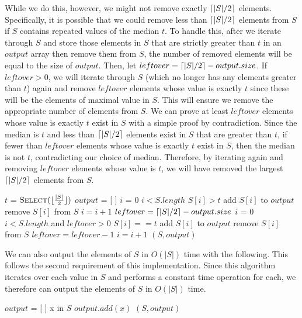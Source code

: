 \documentclass[11pt]{article}
\DeclarePairedDelimiter{\ceil}{\lceil}{\rceil}
\DeclarePairedDelimiter\floor{\lfloor}{\rfloor}
\begin{document}
While we do this, however, we might not remove exactly $\ceil{|S| / 2}$ elements. Specifically, it is possible that we could remove less than $\ceil{|S| / 2}$ elements from $S$ if $S$ contains repeated values of the median $t$. To handle this, after we iterate through $S$ and store those elements in $S$ that are strictly greater than $t$ in an $output$ array then remove them from $S$, the number of removed elements will be equal to the size of $output$. Then, let $leftover = \ceil{|S| / 2} - output.size$. If $leftover > 0$, we will iterate through $S$ (which no longer has any elements greater than $t$) again and remove $leftover$ elements whose value is exactly $t$ since these will be the elements of maximal value in $S$. This will ensure we remove the appropriate number of elements from $S$. We can prove at least $leftover$ elements whose value is exactly $t$ exist in $S$ with a simple proof by contradiction. Since the median is $t$ and less than $\ceil{|S| / 2}$ elements exist in $S$ that are greater than $t$, if fewer than $leftover$ elements whose value is exactly $t$ exist in $S$, then the median is not $t$, contradicting our choice of median. Therefore, by iterating again and removing $leftover$ elements whose value is $t$, we will have removed the largest $\ceil{|S| / 2}$ elements from $S$.

\begin{codebox}
\li $t$ = $\proc{Select}(\floor{\frac{|S|}{2}})$
\li $output$ = [ ]
\li $i$ = 0
\li \While $i < S.length$ \Do
\li     \If $S[i] > t$ \Then
\li         add $S[i]$ to $output$
\li         remove $S[i]$ from $S$
\li     \Else
\li         $i = i + 1$
        \End
    \End
\li $leftover = \ceil{|S| / 2} - output.size$
\li $i$ = 0
\li \While $i < S.length$ and $leftover > 0$ \Do
\li     \If $S[i] == t$ \Then
\li         add $S[i]$ to $output$
\li         remove $S[i]$ from $S$
\li         $leftover = leftover - 1$
\li     \Else
\li         $i = i + 1$
        \End
    \End
\li \Return $(S,output)$
\end{codebox}

We can also output the elements of $S$ in $O(|S|)$ time with the following. This follows the second requirement of this implementation. Since this algorithm iterates over each value in $S$ and performs a constant time operation for each, we therefore can output the elements of $S$ in $O(|S|)$ time.

\begin{codebox}
\li $output$ = [ ]
\li \For x in $S$ \Do
\li     $output.add(x)$
    \End
\li \Return $(S,output)$
\end{codebox}
\end{document}
